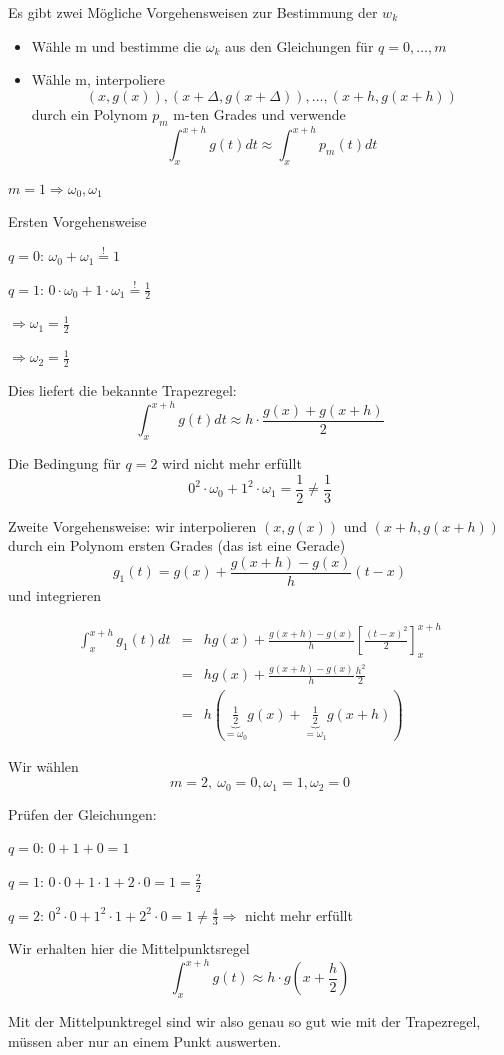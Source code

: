 \documentclass[10pt,a4paper]{article}
\begin{document}
Es gibt zwei Mögliche Vorgehensweisen zur Bestimmung der $w_k$
\begin{itemize}
\item Wähle m und bestimme die $\omega_k$ aus den Gleichungen für $q=0,\ldots,m$
\item Wähle m, interpoliere $$(x,g(x)),(x+\Delta,g(x+\Delta)),\ldots,(x+h,g(x+h))$$ durch ein Polynom $p_m$ m-ten Grades und verwende $$\int_{x}^{x+h} g(t) dt \approx \int_{x}^{x+h} p_m(t) dt$$
\end{itemize}

\begin{bsp}[Bestimmung der Gewicht $\omega_k$ bei $m=1$]
$m=1 \Rightarrow \omega_0, \omega_1$

Ersten Vorgehensweise

$q=0$: $\omega_0 + \omega_1 \stackrel{!}{=} 1$

$q=1$: $0 \cdot \omega_0 + 1\cdot \omega_1 \stackrel{!}{=} \frac{1}{2}$ 

$\Rightarrow \omega_1=\frac{1}{2}$ 

$\Rightarrow \omega_2=\frac{1}{2}$

Dies liefert die bekannte Trapezregel: $$\int_{x}^{x+h} g(t) dt \approx h \cdot \frac{g(x)+g(x+h)}{2}$$

Die Bedingung für $q=2$ wird nicht mehr erfüllt $$0^{2}\cdot\omega_0 +1^{2}\cdot\omega_1=\frac{1}{2} \not= \frac{1}{3}$$

Zweite Vorgehensweise: wir interpolieren $(x,g(x))$ und $(x+h,g(x+h))$ durch ein Polynom ersten Grades (das ist eine Gerade)
$$g_1(t) = g(x) + \frac{g(x+h)-g(x)}{h} (t-x)$$
und integrieren

\begin{eqnarray*}
\int_{x}^{x+h} g_1(t) dt &=& h g(x) + \frac{g(x+h)-g(x)}{h} \left[ \frac{(t-x)^{2}}{2} \right]_{x}^{x+h} \\
&=& h g(x) + \frac{g(x+h)-g(x)}{h} \frac{h^{2}}{2} \\
&=& h \left( \underbrace{\frac{1}{2}}_{=\omega_0} g(x) + \underbrace{\frac{1}{2}}_{=\omega_1} g(x+h) \right)
\end{eqnarray*}

\end{bsp}

\begin{bsp}[Bestimmung der Gewicht $\omega_k$ bei $m=2$]
Wir wählen $$m=2, ~ \omega_0=0, \omega_1=1, \omega_2=0$$

Prüfen der Gleichungen:

$q=0$: $0+1+0=1$

$q=1$: $0\cdot0+1\cdot1+2\cdot0=1=\frac{2}{2}$

$q=2$: $0^{2}\cdot 0+1^{2}\cdot 1+ 2^{2}\cdot 0=1\not= \frac{4}{3} \Rightarrow $ nicht mehr erfüllt

Wir erhalten hier die Mittelpunktsregel $$\int_{x}^{x+h}g(t)\approx h \cdot g(x+\frac{h}{2})$$

Mit der Mittelpunktregel sind wir also genau so gut wie mit der Trapezregel, müssen aber nur an einem Punkt auswerten.
\end{bsp}
\end{document}
